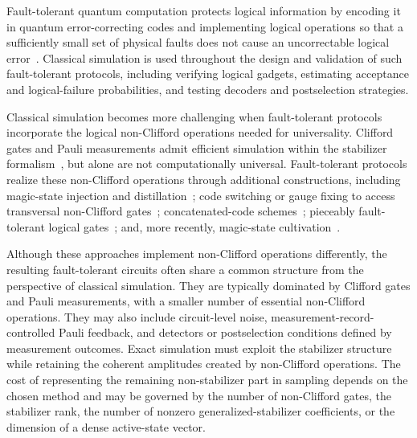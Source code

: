 \documentclass[a4paper,onecolumn,unpublished]{quantumarticle}
\begin{document}
Fault-tolerant quantum computation protects logical information by encoding it in quantum error-correcting codes and implementing logical operations so that a sufficiently small set of physical faults does not cause an uncorrectable logical error~\cite{Shor96,Gottesman97}.
Classical simulation is used throughout the design and validation of such fault-tolerant protocols, including verifying logical gadgets, estimating acceptance and logical-failure probabilities, and testing decoders and postselection strategies.

Classical simulation becomes more challenging when fault-tolerant protocols incorporate the logical non-Clifford operations needed for universality.
Clifford gates and Pauli measurements admit efficient simulation within the stabilizer formalism~\cite{Gottesman98}, but alone are not computationally universal.
Fault-tolerant protocols realize these non-Clifford operations through additional constructions, including magic-state injection and distillation~\cite{BK05,GF19,Litinski19,HIF24,WHY24,LTF+25,ITH+25}; code switching or gauge fixing to access transversal non-Clifford gates~\cite{PR13,ADP14,Hector15,KB15}; concatenated-code schemes~\cite{JL14,CJL16}; pieceably fault-tolerant logical gates~\cite{TYC16,TYC17}; and, more recently, magic-state cultivation~\cite{GSJ24,HTI+25,CCL+26,VJG+26,STC+26,HBW26,CFS26}.

Although these approaches implement non-Clifford operations differently, the resulting fault-tolerant circuits often share a common structure from the perspective of classical simulation.
They are typically dominated by Clifford gates and Pauli measurements, with a smaller number of essential non-Clifford operations.
They may also include circuit-level noise, measurement-record-controlled Pauli feedback, and detectors or postselection conditions defined by measurement outcomes.
Exact simulation must exploit the stabilizer structure while retaining the coherent amplitudes created by non-Clifford operations.
The cost of representing the remaining non-stabilizer part in sampling depends on the chosen method and may be governed by the number of non-Clifford gates, the stabilizer rank, the number of nonzero generalized-stabilizer coefficients, or the dimension of a dense active-state vector.
\end{document}
